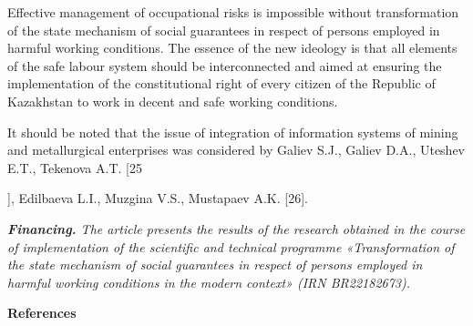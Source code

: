 \begin{multicols}{2}
Effective management of occupational risks is impossible without
transformation of the state mechanism of social guarantees in respect of
persons employed in harmful working conditions. The essence of the new
ideology is that all elements of the safe labour system should be
interconnected and aimed at ensuring the implementation of the
constitutional right of every citizen of the Republic of Kazakhstan to
work in decent and safe working conditions.

It should be noted that the issue of integration of information systems
of mining and metallurgical enterprises was considered by Galiev S.J.,
Galiev D.A., Uteshev E.T., Tekenova A.T. {[}25

{]}, Edilbaeva L.I., Muzgina V.S., Mustapaev A.K. {[}26{]}.

\emph{{\bfseries Financing.} The article presents the results of the
research obtained in the course of implementation of the scientific and
technical programme «Transformation of the state mechanism of social
guarantees in respect of persons employed in harmful working conditions
in the modern context» (IRN BR22182673).}
\end{multicols}

\begin{center}
{\bfseries References}
\end{center}

